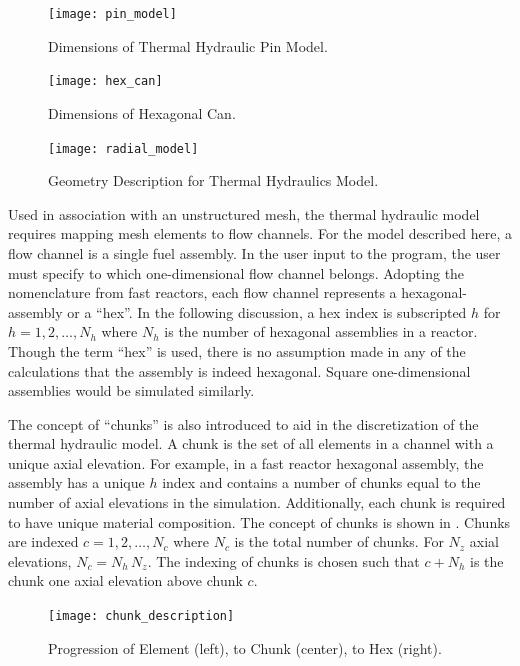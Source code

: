  \begin{figure}
    \centering
    \texttt{[image: pin\_model]}
    \caption{Dimensions of Thermal Hydraulic Pin Model.}
    \label{fig:pin_model}
  \end{figure}

  \begin{figure}
    \centering
    \texttt{[image: hex\_can]}
    \caption{Dimensions of Hexagonal Can.}
    \label{fig:hex_can}
  \end{figure}
  
  \begin{figure}
    \centering
    \texttt{[image: radial\_model]}
    \caption{Geometry Description for Thermal Hydraulics Model.}
    \label{fig:radial_model}
  \end{figure}

  Used in association with an unstructured mesh, the thermal hydraulic model
  requires mapping mesh elements to flow channels. For the model described here,
  a flow channel is a single fuel assembly. In the user input to the
  program, the user must specify to which one-dimensional flow channel belongs.
  Adopting the nomenclature from fast reactors, each flow channel represents a
  hexagonal-assembly or a ``hex''. In the following discussion, a hex index is
  subscripted $h$ for $h = 1,2,\ldots,N_h$ where $N_h$ is the number of
  hexagonal assemblies in a reactor. Though the term ``hex'' is used, there is
  no assumption made in any of the calculations that the assembly is indeed
  hexagonal. Square one-dimensional assemblies would be simulated similarly.

  The concept of ``chunks'' is also introduced to aid in the discretization of
  the thermal hydraulic model. A chunk is the set of all elements in a channel
  with a unique axial elevation. For example, in a fast reactor hexagonal
  assembly, the assembly has a unique $h$ index and contains a number of chunks
  equal to the number of axial elevations in the simulation. Additionally, each 
  chunk is required to have unique material composition. The concept of chunks
  is shown in .  Chunks are indexed
  $c = 1,2,\ldots,N_c$ where $N_c$ is the total number of chunks. For $N_z$
  axial elevations, $N_c = N_h \, N_z$. The indexing
  of chunks is chosen such that $c+N_h$ is the chunk one axial elevation above
  chunk $c$. 

  \begin{figure}
    \centering
    \texttt{[image: chunk\_description]}
    \caption{Progression of Element (left), to Chunk (center), to Hex (right).}
    \label{fig:chunk_description}
  \end{figure}

